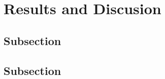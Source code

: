 \section{Results and Discusion}
\label{sec:results_and_discusion}


\subsection{Subsection}
\label{sec:results_and_discusion:subsection1}


\subsection{Subsection}
\label{sec:results_and_discusion:subsection2}

